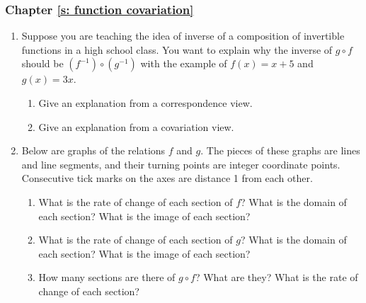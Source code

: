 \documentclass[11pt]{article}
\theoremstyle{definition}
\begin{document}
\begin{center}
\end{center}

	
\newpage

\subsubsection*{Chapter \ref{s: function covariation}}
\begin{enumerate}[resume]
\item %
Suppose you are teaching the idea of inverse of a composition of invertible functions in a high school class. You want to explain why the inverse of $g\circ f$ should be $(f^{-1})\circ (g^{-1})$ with the example
of $f(x)=x+5$ and $g(x)=3x$.
	\begin{enumerate}
	\item Give an explanation from a correspondence view.
	\item Give an explanation from a covariation view.
	\end{enumerate}
	
\item 

Below are graphs of the relations $f$ and $g$. The pieces of these graphs are lines and line segments, and their  turning points are integer coordinate points. Consecutive tick marks on the axes are distance 1 from each other.
    \begin{enumerate}
    \item What is the rate of change of each section of $f$? What is the domain of each section?
     What is the image of each section?
    
    \item What is the rate of change of each section of $g$? What is the domain of each section?  What is the image of each section?
    
    \item How many sections are there of $g\circ f$? What are they? What is the rate of change of each section?
    

\end{enumerate}
\end{enumerate}
\end{document}
